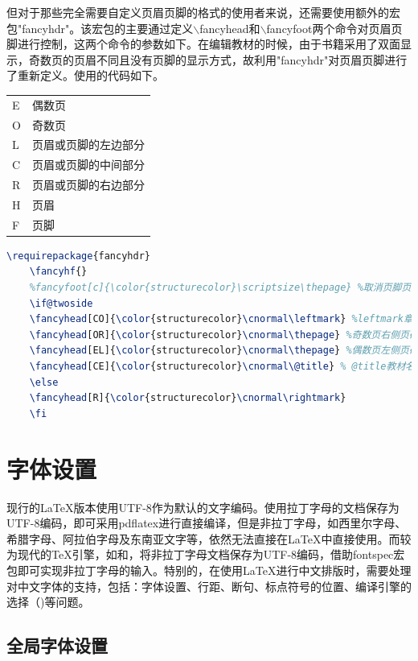 \documentclass[12pt]{book}
\begin{document}
但对于那些完全需要自定义页眉页脚的格式的使用者来说，还需要使用额外的宏包"fancyhdr"。该宏包的主要通过定义$\backslash$fancyhead和$\backslash$fancyfoot两个命令对页眉页脚进行控制，这两个命令的参数如下。在编辑教材的时候，由于书籍采用了双面显示，奇数页的页眉不同且没有页脚的显示方式，故利用"fancyhdr"对页眉页脚进行了重新定义。使用的代码如下。
\begin{table}[h]
	\centering
	\begin{tabular}{ll}
		E &     偶数页\\
		O &     奇数页 \\
		L &     页眉或页脚的左边部分\\
		C &     页眉或页脚的中间部分\\
		R &     页眉或页脚的右边部分\\
		H &     页眉\\
		F &     页脚
	\end{tabular}
\end{table}
\begin{lstlisting}[language=tex,breaklines]
	\requirepackage{fancyhdr}
	\fancyhf{} 
	%fancyfoot[c]{\color{structurecolor}\scriptsize\thepage} %取消页脚页码
	\if@twoside
	\fancyhead[CO]{\color{structurecolor}\cnormal\leftmark} %leftmark章节名称，奇数页页眉中部显示章节名称
	\fancyhead[OR]{\color{structurecolor}\cnormal\thepage} %奇数页右侧页码
	\fancyhead[EL]{\color{structurecolor}\cnormal\thepage} %偶数页左侧页码
	\fancyhead[CE]{\color{structurecolor}\cnormal\@title} % @title教材名称，偶数页页眉中部显示教材名称
	\else
	\fancyhead[R]{\color{structurecolor}\cnormal\rightmark}
	\fi
\end{lstlisting}

\section{字体设置}


现行的\LaTeX{}版本使用UTF-8作为默认的文字编码。使用拉丁字母的文档保存为UTF-8编码，即可采用pdflatex进行直接编译，但是非拉丁字母，如西里尔字母、希腊字母、阿拉伯字母及东南亚文字等，依然无法直接在\LaTeX{}中直接使用。而较为现代的\TeX{}引擎，如\XeTeX{}和\LuaTeX{}，将非拉丁字母文档保存为UTF-8编码，借助fontspec宏包即可实现非拉丁字母的输入。特别的，在使用\LaTeX{}进行中文排版时，需要处理对中文字体的支持，包括：字体设置、行距、断句、标点符号的位置、编译引擎的选择（\XeLaTeX{})等问题。


\subsection{全局字体设置}
\end{document}
